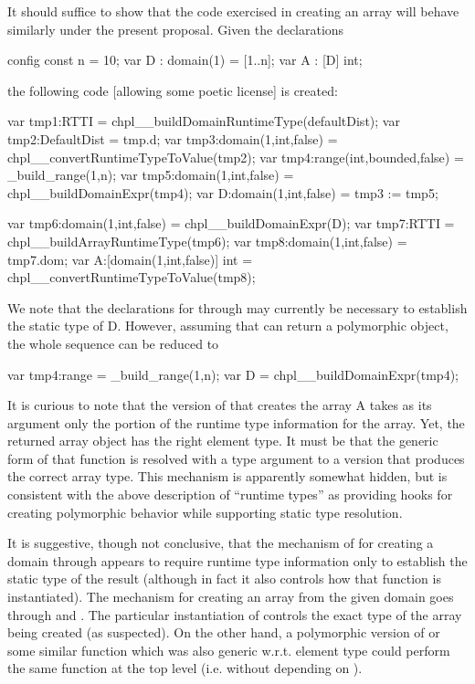 \begin{chapelexample}
It should suffice to show that the code exercised in creating an array will
behave similarly under the present proposal.  Given the declarations
\begin{chapel}
config const n = 10;
var D : domain(1) = [1..n];
var A : [D] int;
\end{chapel}
\noindent
the following code [allowing some poetic license] is created:
\begin{chapel}
var tmp1:RTTI = chpl__buildDomainRuntimeType(defaultDist);
var tmp2:DefaultDist = tmp.d;
var tmp3:domain(1,int,false) = chpl__convertRuntimeTypeToValue(tmp2);
var tmp4:range(int,bounded,false) = _build_range(1,n);
var tmp5:domain(1,int,false) = chpl__buildDomainExpr(tmp4);
var D:domain(1,int,false) = tmp3 := tmp5;

var tmp6:domain(1,int,false) = chpl__buildDomainExpr(D);
var tmp7:RTTI = chpl__buildArrayRuntimeType(tmp6);
var tmp8:domain(1,int,false) = tmp7.dom;
var A:[domain(1,int,false)] int = chpl__convertRuntimeTypeToValue(tmp8);
\end{chapel}
We note that the declarations for  through  may currently
be necessary to establish the static type of D.  However, assuming that
 can return a polymorphic object, the whole sequence can
be reduced to 
\begin{chapel}
var tmp4:range = _build_range(1,n);
var D = chpl__buildDomainExpr(tmp4);
\end{chapel}

It is curious to note that the version
of  that creates the array A takes as
its argument only the  portion of the runtime type information for
the array.  Yet, the returned array object has the right element type.  It must
be that the generic form of that function is resolved with a type argument to a
version that produces the correct array type.  This mechanism is apparently
somewhat hidden, but is consistent with the above description of ``runtime
types'' as providing hooks for creating polymorphic behavior while supporting
static type resolution.

It is suggestive, though not conclusive, that the mechanism of
for creating a domain through  appears to require runtime
type information only to establish the static type of the result (although in
fact it also controls how that function is instantiated).  The mechanism for
creating an array from the given domain goes through  and
.  The particular instantiation of
  controls the exact type of the array being
created (as suspected).  On the other hand, a polymorphic version of
 or some similar function which was also generic w.r.t. element type
could perform the same function at the top level (i.e. without depending on
).


\end{chapelexample}
